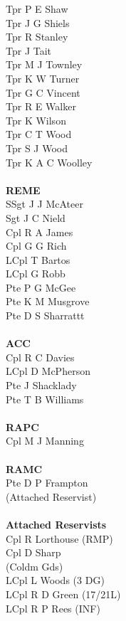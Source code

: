 \begin{multicols}{4}
  Tpr P E Shaw \\
  Tpr J G Shiels \\
  Tpr R Stanley \\
  Tpr J Tait \\
  Tpr M J Townley \\
  Tpr K W Turner \\
  Tpr G C Vincent \\
  Tpr R E Walker \\
  Tpr K Wilson \\
  Tpr C T Wood \\
  Tpr S J Wood \\
  Tpr K A C Woolley \\
  \\
  \textbf{REME} \\
  SSgt J J McAteer \\
  Sgt J C Nield \\
  Cpl R A James \\
  Cpl G G Rich \\
  LCpl T Bartos \\
  LCpl G Robb \\
  Pte P G McGee \\
  Pte K M Musgrove \\
  Pte D S Sharrattt \\
  \\
  \textbf{ACC} \\
  Cpl R C Davies \\
  LCpl D McPherson \\
  Pte J Shacklady \\
  Pte T B Williams \\
  \\
  \textbf{RAPC} \\
  Cpl M J Manning \\
  \\
  \textbf{RAMC} \\
  Pte D P Frampton \\ \indent (Attached Reservist) \\
  \\
  \textbf{Attached Reservists} \\
  Cpl R Lorthouse (RMP) \\
  Cpl D Sharp \\ \indent (Coldm Gds) \\
  LCpl L Woods (3 DG) \\
  LCpl R D Green (17/21L) \\
  LCpl R P Rees (INF) \\

\end{multicols}
